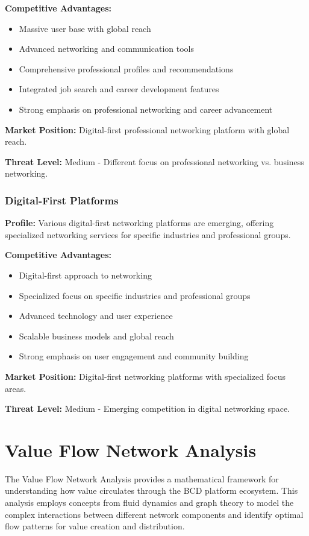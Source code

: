 \textbf{Competitive Advantages:}
\begin{itemize}
    \item Massive user base with global reach
    \item Advanced networking and communication tools
    \item Comprehensive professional profiles and recommendations
    \item Integrated job search and career development features
    \item Strong emphasis on professional networking and career advancement
\end{itemize}

\textbf{Market Position:} Digital-first professional networking platform with global reach.

\textbf{Threat Level:} Medium - Different focus on professional networking vs. business networking.

\subsubsection{Digital-First Platforms}
\textbf{Profile:} Various digital-first networking platforms are emerging, offering specialized networking services for specific industries and professional groups.

\textbf{Competitive Advantages:}
\begin{itemize}
    \item Digital-first approach to networking
    \item Specialized focus on specific industries and professional groups
    \item Advanced technology and user experience
    \item Scalable business models and global reach
    \item Strong emphasis on user engagement and community building
\end{itemize}

\textbf{Market Position:} Digital-first networking platforms with specialized focus areas.

\textbf{Threat Level:} Medium - Emerging competition in digital networking space.

\section{Value Flow Network Analysis}

The Value Flow Network Analysis provides a mathematical framework for understanding how value circulates through the BCD platform ecosystem. This analysis employs concepts from fluid dynamics and graph theory to model the complex interactions between different network components and identify optimal flow patterns for value creation and distribution.

